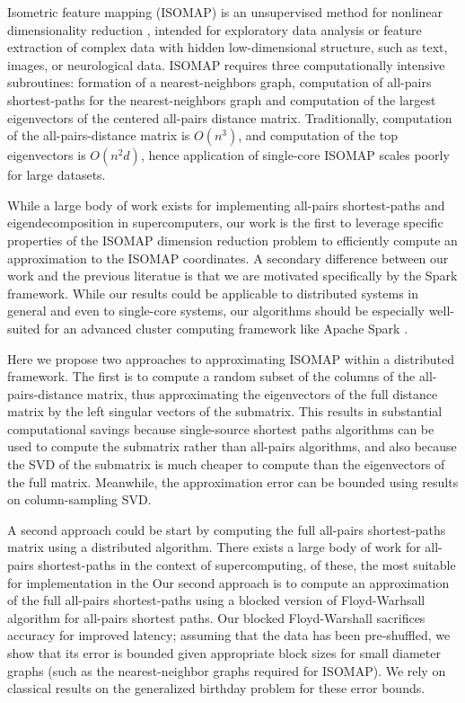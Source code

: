 \documentclass{article} %
\begin{document}
Isometric feature mapping (ISOMAP) is an unsupervised method for
nonlinear dimensionality reduction \cite{Tenenbaum2000}, intended
for exploratory data analysis or feature extraction of complex data
with hidden low-dimensional structure, such as text, images, or
neurological data.  ISOMAP requires three computationally intensive
subroutines: formation of a nearest-neighbors graph, computation of
all-pairs shortest-paths for the nearest-neighbors graph and
computation of the largest eigenvectors of the centered all-pairs
distance matrix.  Traditionally, computation of the all-pairs-distance
matrix is $O(n^3)$, and computation of the top eigenvectors is
$O(n^2d)$, hence application of single-core ISOMAP scales poorly for
large datasets.

While a large body of work exists for implementing all-pairs
shortest-paths and eigendecomposition in supercomputers, our work is
the first to leverage specific properties of the ISOMAP dimension
reduction problem to efficiently compute an approximation to the
ISOMAP coordinates.  A secondary difference between our work and the
previous literatue is that we are motivated specifically by the Spark
framework.  While our results could be applicable to distributed
systems in general and even to single-core systems, our algorithms
should be especially well-suited for an advanced cluster computing
framework like Apache Spark \cite{Zaharia2010}.

Here we propose two approaches to approximating ISOMAP within a
distributed framework.  The first is to compute a random subset of the
columns of the all-pairs-distance matrix, thus approximating the
eigenvectors of the full distance matrix by the left singular vectors
of the submatrix.  This results in substantial computational savings
because single-source shortest paths algorithms can be used to compute
the submatrix rather than all-pairs algorithms, and also because the
SVD of the submatrix is much cheaper to compute than the eigenvectors
of the full matrix.  Meanwhile, the approximation error can be bounded
using results on column-sampling SVD\cite{Frieze2004}.

A second approach could be start by computing the full all-pairs
shortest-paths matrix using a distributed algorithm.  There exists a
large body of work for all-pairs shortest-paths in the context of
supercomputing, of these, the most suitable for implementation in the
\cite{Kumar1991} Our second approach is to compute an approximation of
the full all-pairs shortest-paths using a blocked version of
Floyd-Warhsall algorithm for all-pairs shortest paths.  Our blocked
Floyd-Warshall sacrifices accuracy for improved latency; assuming that
the data has been pre-shuffled, we show that its error is bounded
given appropriate block sizes for small diameter graphs (such as the
nearest-neighbor graphs required for ISOMAP).  We rely on classical
results on the generalized birthday problem \cite{kolchin1978random}
for these error bounds.

\small{


}
\end{document}
